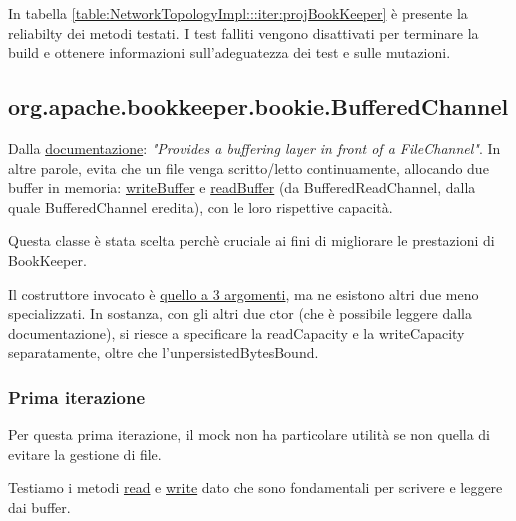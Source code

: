 \documentclass[10pt, a4paper]{article}
\newcommand{\gettablelabel}[5]{table:#1:#2:#3:iter#4:proj#5}
\newcommand{\getreltablelabel}[2]{\gettablelabel{#1}{}{}{}{#2}}
\def\bookkeeper{BookKeeper}
\begin{document}
	In tabella \ref{\getreltablelabel{NetworkTopologyImpl}{\bookkeeper}} è
	presente la reliabilty dei metodi testati. I test falliti vengono disattivati
	per terminare la build e ottenere informazioni sull'adeguatezza dei test e
	sulle mutazioni.

	\subsection{org.apache.bookkeeper.bookie.BufferedChannel}
	Dalla 
	\href{https://bookkeeper.apache.org/docs/latest/api/javadoc/org/apache/bookkeeper/bookie/BufferedChannel.html}
	{documentazione}: \textit{"Provides a buffering layer in front of a FileChannel"}.
	In altre parole, evita che un file venga scritto/letto continuamente, allocando due buffer in memoria:
	\href{https://bookkeeper.apache.org/docs/latest/api/javadoc/org/apache/bookkeeper/bookie/BufferedChannel.html#writeBuffer}
	{writeBuffer} e 
	\href{https://bookkeeper.apache.org/docs/latest/api/javadoc/org/apache/bookkeeper/bookie/BufferedReadChannel.html#readBuffer}
	{readBuffer} (da BufferedReadChannel, dalla quale BufferedChannel eredita), con le loro rispettive capacità.
	
	Questa classe è stata scelta perchè cruciale ai fini di migliorare le prestazioni di \bookkeeper.
	
	Il costruttore invocato è \href{https://bookkeeper.apache.org/docs/latest/api/javadoc/org/apache/bookkeeper/bookie/BufferedChannel.html#\%3Cinit\%3E(io.netty.buffer.ByteBufAllocator,java.nio.channels.FileChannel,int)}
	{quello a 3 argomenti}, ma ne esistono altri due meno specializzati. In sostanza, con gli altri due ctor
	(che è possibile leggere dalla documentazione), si riesce a specificare la readCapacity e la writeCapacity
	separatamente, oltre che l'unpersistedBytesBound.
	
	\subsubsection{Prima iterazione}
	Per questa prima iterazione, il mock non ha particolare utilità se non quella di evitare la gestione di file.
	
	Testiamo i metodi 
	\href{https://bookkeeper.apache.org/docs/latest/api/javadoc/org/apache/bookkeeper/bookie/BufferedChannel.html#read(io.netty.buffer.ByteBuf,long,int)}
	{read} e
	\href{https://bookkeeper.apache.org/docs/latest/api/javadoc/org/apache/bookkeeper/bookie/BufferedChannel.html#write(io.netty.buffer.ByteBuf)}
	{write}
	dato che sono fondamentali per scrivere e leggere dai buffer.
	
\end{document}

